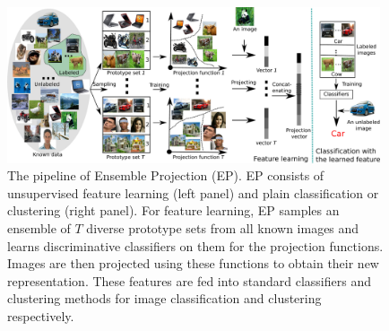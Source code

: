 \documentclass[preprint,12pt,3p]{elsarticle}
\begin{document}


\begin{figure}[t]
  \centering
  \includegraphics[width=0.98\textwidth]{./pipeline.jpg}
  \caption{The pipeline of Ensemble Projection (EP). EP consists of
    unsupervised feature learning (left panel) and plain
    classification or clustering (right panel). For feature learning,
    EP samples an ensemble of $T$ diverse prototype sets from all
    known images and learns discriminative classifiers on them for the
    projection functions. Images are then projected using these
    functions to obtain their new representation. These features are
    fed into standard classifiers and clustering methods for image
    classification and clustering respectively.}
\label{fig:pipeline}
\end{figure}
\end{document}
